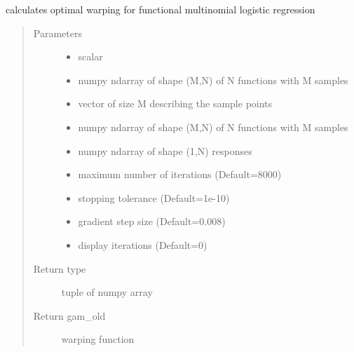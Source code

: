 \documentclass[letterpaper,10pt,english]{sphinxmanual}
\begin{document}
\begin{fulllineitems}
\label{\detokenize{regression:regression.mlogit_warp_grad}}
calculates optimal warping for functional multinomial logistic regression
\begin{quote}\begin{description}
\item[{Parameters}] \leavevmode\begin{itemize}
\item {} 
 \textendash{} scalar

\item {} 
 \textendash{} numpy ndarray of shape (M,N) of N functions with M samples

\item {} 
 \textendash{} vector of size M describing the sample points

\item {} 
 \textendash{} numpy ndarray of shape (M,N) of N functions with M samples

\item {} 
 \textendash{} numpy ndarray of shape (1,N) responses

\item {} 
 \textendash{} maximum number of iterations (Default=8000)

\item {} 
 \textendash{} stopping tolerance (Default=1e-10)

\item {} 
 \textendash{} gradient step size (Default=0.008)

\item {} 
 \textendash{} display iterations (Default=0)

\end{itemize}

\item[{Return type}] \leavevmode
tuple of numpy array

\item[{Return gam\_old}] \leavevmode
warping function

\end{description}\end{quote}

\end{fulllineitems}
\end{document}
